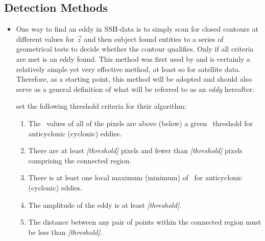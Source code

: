 \subsection{Detection Methods} \label{subsec:detectmethods}
\begin{itemize}

	\item
	One way to find an eddy in SSH-data is to simply scan for closed contours at different values for $\vec{z}$ and then subject found entities to a series of geometrical tests to decide whether the contour qualifies. Only if all criteria are met is an eddy found. This method was first used by \citet{Chelton2011} and is certainly a relatively simple yet very effective method, at least so for satellite data. Therefore, as a starting point, this method will be adopted and should also serve as a general definition of what will be referred to as an \textit{eddy} hereafter.
	
 set the following threshold criteria for their algorithm:
	\begin{enumerate}
		\item
		The \SSH~values of all of the pixels are above (below) a given \SSH~threshold for anticyclonic (cyclonic) eddies.
		\item
		There are at least \textit{[threshold]} pixels and fewer than \textit{[threshold]} pixels comprising the connected region.
		\item
		There is at least one local maximum (minimum) of \SSH~for anticyclonic (cyclonic) eddies.
		\item
		The amplitude of the eddy is at least \textit{[threshold]}.
		\item
		The distance between any pair of points within the connected region must be less than \textit{[threshold]}.
	\end{enumerate}


\end{itemize}
